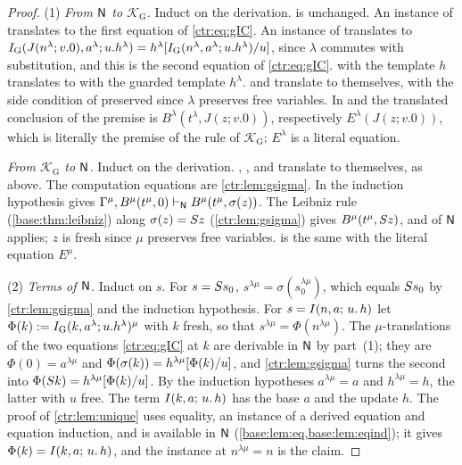 \begin{proof}
(1) \emph{From $\mathsf{N}$ to $\mathcal K_{\mathrm G}$.} Induct on the derivation. 
is unchanged. An instance of  translates to the first equation of
\eqref{ctr:eq:gIC}. An instance of  translates to
$I_{\mathrm G}(J(n^\lambda;v.0),a^\lambda;u.h^\lambda)=
h^\lambda[I_{\mathrm G}(n^\lambda,a^\lambda;u.h^\lambda)/u]$, since $\lambda$
commutes with substitution, and this is the second equation of \eqref{ctr:eq:gIC}.
 with the template $h$ translates to  with the guarded template
$h^\lambda$.  and  translate to themselves, with the side
condition of  preserved since $\lambda$ preserves free variables. In
 and  the translated conclusion of the premise is
$B^\lambda(t^\lambda,J(z;v.0))$, respectively $E^\lambda(J(z;v.0))$, which is literally the
premise of the rule of $\mathcal K_{\mathrm G}$; $E^\lambda$ is a literal equation.

\emph{From $\mathcal K_{\mathrm G}$ to $\mathsf{N}$.} Induct on the derivation. ,
,  and  translate to themselves, as above. The
computation equations are \cref{ctr:lem:gsigma}. In  the induction hypothesis
gives $\Gamma^\mu,B^\mu(t^\mu,0)\vdash_{\mathsf{N}}B^\mu(t^\mu,\sigma(z))$. The Leibniz rule
(\cref{base:thm:leibniz}) along $\sigma(z)=S z$ (\cref{ctr:lem:gsigma}) gives
$B^\mu(t^\mu,S z)$, and  of $\mathsf{N}$ applies; $z$ is fresh since $\mu$
preserves free variables.  is the same with the literal equation $E^\mu$.

(2) \emph{Terms of $\mathsf{N}$.} Induct on $s$. For $s=S s_0$, $s^{\lambda\mu}=\sigma(s_0^{\lambda\mu})$,
which equals $S s_0$ by \cref{ctr:lem:gsigma} and the induction hypothesis. For
$s=I(n,a;\,u.\,h)$ let $\Phi(k)\mathrel{:=} I_{\mathrm G}(k,a^\lambda;u.h^\lambda)^\mu$ with $k$
fresh, so that $s^{\lambda\mu}=\Phi(n^{\lambda\mu})$. The $\mu$-translations of the two
equations \eqref{ctr:eq:gIC} at $k$ are derivable in $\mathsf{N}$ by part~(1); they are
$\Phi(0)=a^{\lambda\mu}$ and $\Phi(\sigma(k))=h^{\lambda\mu}[\Phi(k)/u]$, and
\cref{ctr:lem:gsigma} turns the second into $\Phi(S k)=h^{\lambda\mu}[\Phi(k)/u]$.
By the induction hypotheses $a^{\lambda\mu}=a$ and $h^{\lambda\mu}=h$, the latter with $u$
free. The term $I(k,a;\,u.\,h)$ has the base $a$ and the update $h$. The proof of
\cref{ctr:lem:unique} uses equality, an instance of a derived equation and equation
induction, and is available in $\mathsf{N}$ (\cref{base:lem:eq,base:lem:eqind}); it gives
$\Phi(k)=I(k,a;\,u.\,h)$, and the instance at $n^{\lambda\mu}=n$ is the claim.


\end{proof}
